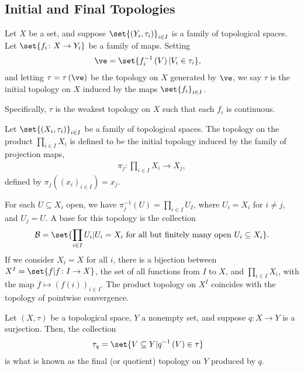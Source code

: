 \subsection{Initial and Final Topologies}%
\begin{definition}
  Let $X$ be a set, and suppose $\set{\left(Y_i,\tau_i\right)}_{i\in I}$ is a family of topological spaces. Let $\set{f_i\colon X\rightarrow Y_i}$ be a family of maps. Setting
  \begin{align*}
    \ve &= \set{f_i^{-1}\left(V\right) | V_i\in \tau_i},
  \end{align*}
  and letting $\tau = \tau\left(\ve\right)$ be the topology on $X$ generated by $\ve$, we say $\tau$ is the initial topology on $X$ induced by the maps $\set{f_i}_{i\in I}$.\newline

  Specifically, $\tau$ is the weakest topology on $X$ such that each $f_i$ is continuous.
\end{definition}
\begin{definition}
  Let $\set{\left(X_i,\tau_i\right)}_{i\in I}$ be a family of topological spaces. The topology on the product $\prod_{i\in I}X_i$ is defined to be the initial topology induced by the family of projection maps,
  \begin{align*}
    \pi_j\colon \prod_{i\in I}X_i\rightarrow X_j,
  \end{align*}
  defined by $\pi_j\left(\left(x_i\right)_{i\in I}\right) = x_j$.\newline
  
  For each $U\subseteq X_i$ open, we have $\pi_j^{-1}\left(U\right) = \prod_{i\in I}U_I$, where $U_i = X_i$ for $i\neq j$, and $U_j = U$. A base for this topology is the collection
  \begin{align*}
    \mathcal{B} = \set{\prod_{i\in I}U_i | U_i = X_i\text{ for all but finitely many open }U_i\subseteq X_i}.
  \end{align*}
  If we consider $X_i = X$ for all $i$, there is a bijection between $X^I \coloneq \set{f | f\colon I\rightarrow X}$, the set of all functions from $I$ to $X$, and $\prod_{i\in I}X_i$, with the map $f \mapsto \left(f\left(i\right)\right)_{i\in I}$. The product topology on $X^I$ coincides with the topology of pointwise convergence.
\end{definition}
\begin{definition}
  Let $\left(X,\tau\right)$ be a topological space, $Y$ a nonempty set, and suppose $q\colon X\rightarrow Y$ is a surjection. Then, the collection
  \begin{align*}
    \tau_q &\coloneq \set{V\subseteq Y | q^{-1}\left(V\right)\in \tau}
  \end{align*}
  is what is known as the final (or quotient) topology on $Y$ produced by $q$.
\end{definition}
